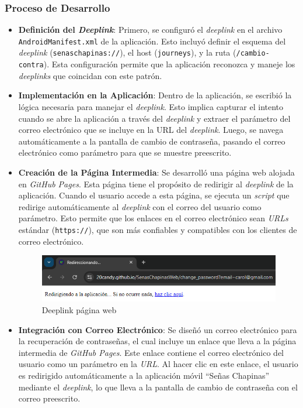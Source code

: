 \subsubsection*{Proceso de Desarrollo}
\begin{itemize}
    \item \textbf{Definición del \textit{Deeplink}}: Primero, se configuró el \textit{deeplink} en el archivo \texttt{AndroidManifest.xml} de la aplicación. Esto incluyó definir el esquema del \textit{deeplink} (\texttt{senaschapinas://}), el host (\texttt{journeys}), y la ruta (\texttt{/cambio-contra}). Esta configuración permite que la aplicación reconozca y maneje los \textit{deeplinks} que coincidan con este patrón.
    
    \item \textbf{Implementación en la Aplicación}: Dentro de la aplicación, se escribió la lógica necesaria para manejar el \textit{deeplink}. Esto implica capturar el intento cuando se abre la aplicación a través del \textit{deeplink} y extraer el parámetro del correo electrónico que se incluye en la URL del \textit{deeplink}. Luego, se navega automáticamente a la pantalla de cambio de contraseña, pasando el correo electrónico como parámetro para que se muestre preescrito.
    
    \item \textbf{Creación de la Página Intermedia}: Se desarrolló una página web alojada en\textit{ GitHub Pages}. Esta página tiene el propósito de redirigir al \textit{deeplink} de la aplicación. Cuando el usuario accede a esta página, se ejecuta un \textit{script} que redirige automáticamente al \textit{ deeplink} con el correo del usuario como parámetro. Esto permite que los enlaces en el correo electrónico sean \textit{URLs} estándar (\texttt{https://}), que son más confiables y compatibles con los clientes de correo electrónico.

        \begin{figure} [H]
            \centering
            \includegraphics[width=0.5\linewidth]{figuras/pagina_web_deeplink.png}
            \caption{Deeplink página web}
            \label{fig:enter-label}
        \end{figure}
        
    
    \item \textbf{Integración con Correo Electrónico}: Se diseñó un correo electrónico para la recuperación de contraseñas, el cual incluye un enlace que lleva a la página intermedia de \textit{GitHub Pages}. Este enlace contiene el correo electrónico del usuario como un parámetro en la \textit{URL}. Al hacer clic en este enlace, el usuario es redirigido automáticamente a la aplicación móvil ``Señas Chapinas'' mediante el \textit{deeplink}, lo que lleva a la pantalla de cambio de contraseña con el correo preescrito.
           

\end{itemize}
